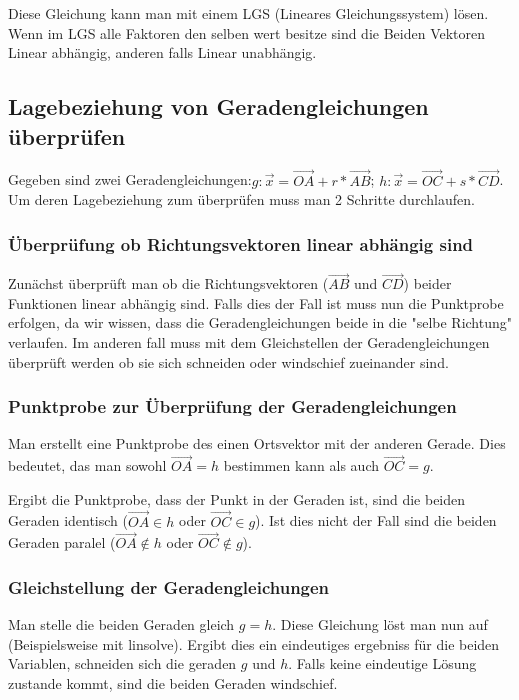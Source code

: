 \documentclass{article}
\begin{document}
Diese Gleichung kann man mit einem LGS (Lineares Gleichungssystem) lösen. Wenn im LGS alle Faktoren den selben wert besitze sind die Beiden Vektoren Linear abhängig, anderen falls Linear unabhängig.

\subsection{Lagebeziehung von Geradengleichungen überprüfen}
Gegeben sind zwei Geradengleichungen:$g : \vec{x} = \vec{OA} + r * \vec{AB}$; $h : \vec{x} = \vec{OC} + s * \vec{CD}$. Um deren Lagebeziehung zum überprüfen muss man 2 Schritte durchlaufen.

\subsubsection{Überprüfung ob Richtungsvektoren linear abhängig sind}
Zunächst überprüft man ob die Richtungsvektoren ($\vec{AB}$ und $\vec{CD}$) beider Funktionen linear abhängig sind. Falls dies der Fall ist muss nun die Punktprobe erfolgen, da wir wissen, dass die Geradengleichungen beide in die "selbe Richtung" verlaufen. Im anderen fall muss mit dem Gleichstellen der Geradengleichungen überprüft werden ob sie sich schneiden oder windschief zueinander sind.

\subsubsection{Punktprobe zur Überprüfung der Geradengleichungen}
Man erstellt eine Punktprobe des einen Ortsvektor mit der anderen Gerade. Dies bedeutet, das man sowohl $\vec{OA} = h$ bestimmen kann als auch $\vec{OC} = g$.

Ergibt die Punktprobe, dass der Punkt in der Geraden ist, sind die beiden Geraden identisch ($\vec{OA} \in h$ oder $\vec{OC} \in g$). Ist dies nicht der Fall sind die beiden Geraden paralel ($\vec{OA} \notin h$ oder $\vec{OC} \notin g$).

\subsubsection{Gleichstellung der Geradengleichungen}
Man stelle die beiden Geraden gleich $g = h$. Diese Gleichung löst man nun auf (Beispielsweise mit linsolve). Ergibt dies ein eindeutiges ergebniss für die beiden Variablen, schneiden sich die geraden $g$ und $h$. Falls keine eindeutige Lösung zustande kommt, sind die beiden Geraden windschief. 
\end{document}
